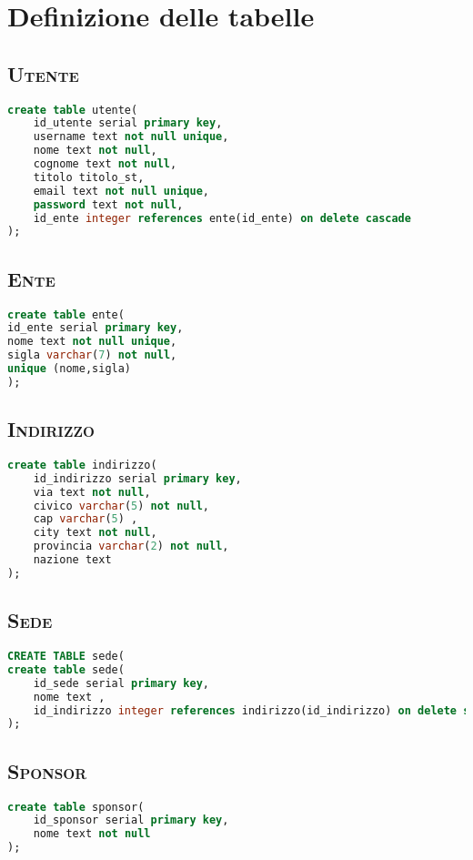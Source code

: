 \section{Definizione delle tabelle}
\subsection{\textsc{Utente}}
\begin{lstlisting}[language=SQL,style=mystyle,caption={Tabella: Utente}]
create table utente(
    id_utente serial primary key,
    username text not null unique,
    nome text not null,
    cognome text not null,
    titolo titolo_st,
    email text not null unique,
    password text not null,
    id_ente integer references ente(id_ente) on delete cascade
);
\end{lstlisting}
\subsection{\textsc{Ente}}
\begin{lstlisting}[language=SQL,style=mystyle,caption={Tabella: Ente}]
create table ente(
id_ente serial primary key,
nome text not null unique,
sigla varchar(7) not null,
unique (nome,sigla)
);
\end{lstlisting}
\subsection{\textsc{Indirizzo}}
\begin{lstlisting}[language=SQL,style=mystyle,caption={Tabella: Indirizzo}]
create table indirizzo(
    id_indirizzo serial primary key,
    via text not null,
    civico varchar(5) not null,
    cap varchar(5) ,
    city text not null,
    provincia varchar(2) not null,
    nazione text
);
\end{lstlisting}
\subsection{\textsc{Sede}}
\begin{lstlisting}[language=SQL,style=mystyle,caption={Tabella:  Sede}]
CREATE TABLE sede(
create table sede(
    id_sede serial primary key,
    nome text ,
    id_indirizzo integer references indirizzo(id_indirizzo) on delete set null
);
\end{lstlisting}
\subsection{\textsc{Sponsor}}
\begin{lstlisting}[language=SQL,style=mystyle,caption={Tabella: Sponsor}]
create table sponsor(
    id_sponsor serial primary key,
    nome text not null
);
\end{lstlisting}
